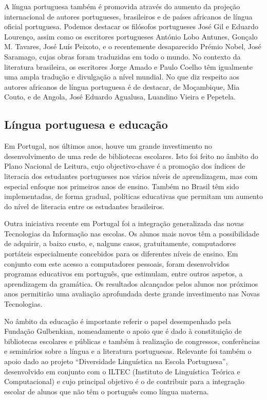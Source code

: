 \documentclass[]{../metanetpaper}
\begin{document}
\begin{multicols}{2}
A língua portuguesa também é promovida através do aumento da projeção internacional de autores portugueses, brasileiros e de países africanos de língua oficial portuguesa. Podemos destacar os filósofos portugueses José Gil e Eduardo Lourenço, assim como os escritores portugueses António Lobo Antunes, Gonçalo M. Tavares, José Luís Peixoto, e o recentemente desaparecido Prémio Nobel, José Saramago, cujas obras foram traduzidas em todo o mundo. No contexto da literatura brasileira, os escritores Jorge Amado e Paulo Coelho têm igualmente uma ampla tradução e divulgação a nível mundial. No que diz respeito aos autores africanos de língua portuguesa é de destacar, de Moçambique, Mia Couto, e de Angola, José Eduardo Agualusa, Luandino Vieira e Pepetela.

\subsection{Língua portuguesa e educação}

Em Portugal, nos últimos anos, houve um grande investimento no desenvolvimento de uma rede de bibliotecas escolares. Isto foi feito no âmbito do Plano Nacional de Leitura, cujo objectivo-chave é a promoção dos índices de literacia dos estudantes portugueses nos vários níveis de aprendizagem, mas com especial enfoque nos primeiros anos de ensino. Também no Brasil têm sido implementadas, de forma gradual, políticas educativas que permitam um aumento do nível de literacia entre os estudantes brasileiros.

Outra iniciativa recente em Portugal foi a integração generalizada das novas Tecnologias da Informação nas escolas. Os alunos mais novos têm a possibilidade de adquirir, a baixo custo, e, nalguns casos, gratuitamente, computadores portáteis especialmente concebidos para os diferentes níveis de ensino. Em conjunto com este acesso a computadores pessoais, foram desenvolvidos programas educativos em português, que estimulam, entre outros aspetos, a aprendizagem da gramática. Os resultados alcançados pelos alunos nos próximos anos permitirão uma avaliação aprofundada deste grande investimento nas Novas Tecnologias.


No âmbito da educação é importante referir o papel desempenhado pela Fundação Gulbenkian, nomeadamente o apoio que é dado à constituição de bibliotecas escolares e públicas e também à rea\-li\-za\-ção de congressos, conferências e seminários sobre a língua e a literatura portuguesas. Relevante foi também o apoio dado ao projeto “Diversidade Linguística na Escola Portuguesa”\cite{gulbenkian2}, desenvolvido em conjunto com o ILTEC (Instituto de Linguística Teórica e Computacional) e cujo principal objetivo é o de contribuir para a integração escolar de alunos que não têm o português como língua materna.


\end{multicols}
\end{document}
